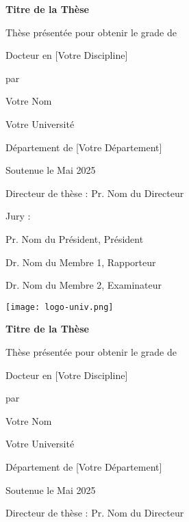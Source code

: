 \documentclass[a4paper,12pt]{report}
\newcommand{\thesisTitle}{Titre de la Thèse}
\newcommand{\authorName}{Votre Nom}
\newcommand{\degree}{Docteur en [Votre Discipline]}
\newcommand{\university}{Votre Université}
\newcommand{\department}{Département de [Votre Département]}
\newcommand{\submissionDate}{Mai 2025}
\newcommand{\supervisor}{Pr. Nom du Directeur}
\newcommand{\juryPresident}{Pr. Nom du Président}
\newcommand{\juryMemberOne}{Dr. Nom du Membre 1}
\newcommand{\juryMemberTwo}{Dr. Nom du Membre 2}
\begin{document}
\begin{titlepage}
    \centering
    \vspace*{2cm}
    {\LARGE\bfseries \thesisTitle \par}
    \vspace{1.5cm}
    {\large Thèse présentée pour obtenir le grade de \par}
    {\Large \degree \par}
    \vspace{1cm}
    {\large par \par}
    {\Large \authorName \par}
    \vspace{1.5cm}
    {\large \university \par}
    {\large \department \par}
    \vspace{1cm}
    {\large Soutenue le \submissionDate \par}
    \vspace{1cm}
    {\large Directeur de thèse : \supervisor \par}
    \vspace{0.5cm}
    {\large Jury : \par}
    {\large \juryPresident, Président \par}
    {\large \juryMemberOne, Rapporteur \par}
    {\large \juryMemberTwo, Examinateur \par}
    \vfill
    {\large \texttt{[image: logo-univ.png]} \par}
\end{titlepage}

\clearpage
\thispagestyle{empty}
\null
\clearpage

\begin{titlepage}
    \centering
    \vspace*{2cm}
    {\LARGE\bfseries \thesisTitle \par}
    \vspace{1.5cm}
    {\large Thèse présentée pour obtenir le grade de \par}
    {\Large \degree \par}
    \vspace{1cm}
    {\large par \par}
    {\Large \authorName \par}
    \vspace{1.5cm}
    {\large \university \par}
    {\large \department \par}
    \vspace{1cm}
    {\large Soutenue le \submissionDate \par}
    \vspace{1cm}
    {\large Directeur de thèse : \supervisor \par}
\end{titlepage}
\end{document}
